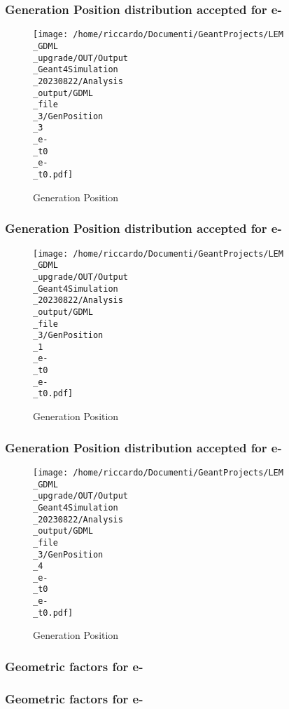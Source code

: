 \documentclass[8pt]{beamer}
\begin{document}
            \begin{frame}
                \frametitle{Generation Position distribution accepted for e-}
            
        \begin{figure}[h]
            \centering
            \texttt{[image: /home/riccardo/Documenti/GeantProjects/LEM\\\_GDML\\\_upgrade/OUT/Output\\\_Geant4Simulation\\\_20230822/Analysis\\\_output/GDML\\\_file\\\_3/GenPosition\\\_3\\\_e-\\\_t0\\\_e-\\\_t0.pdf]}
            \caption{Generation Position}
        \end{figure}
        
            \end{frame}
            
            \begin{frame}
                \frametitle{Generation Position distribution accepted for e-}
            
        \begin{figure}[h]
            \centering
            \texttt{[image: /home/riccardo/Documenti/GeantProjects/LEM\\\_GDML\\\_upgrade/OUT/Output\\\_Geant4Simulation\\\_20230822/Analysis\\\_output/GDML\\\_file\\\_3/GenPosition\\\_1\\\_e-\\\_t0\\\_e-\\\_t0.pdf]}
            \caption{Generation Position}
        \end{figure}
        
            \end{frame}
            
            \begin{frame}
                \frametitle{Generation Position distribution accepted for e-}
            
        \begin{figure}[h]
            \centering
            \texttt{[image: /home/riccardo/Documenti/GeantProjects/LEM\\\_GDML\\\_upgrade/OUT/Output\\\_Geant4Simulation\\\_20230822/Analysis\\\_output/GDML\\\_file\\\_3/GenPosition\\\_4\\\_e-\\\_t0\\\_e-\\\_t0.pdf]}
            \caption{Generation Position}
        \end{figure}
        
            \end{frame}
            
            \begin{frame}
                \frametitle{Geometric factors for e-}
            
            \end{frame}
            
            \begin{frame}
                \frametitle{Geometric factors for e-}
            
            \end{frame}
            
\end{document}
